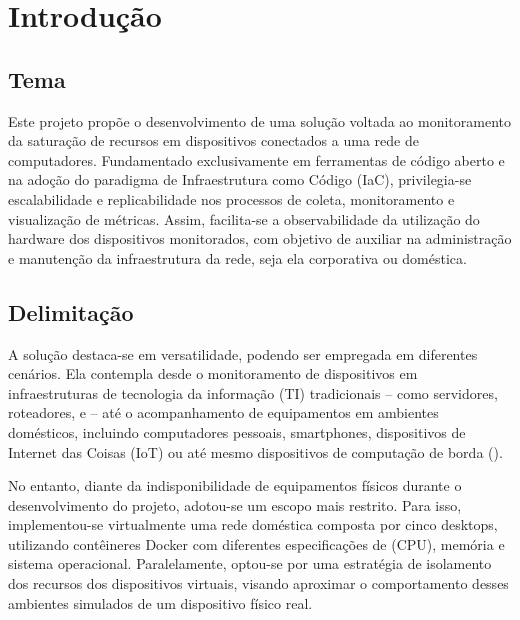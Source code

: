 \chapter{Introdução}
\label{chap1}

\section{Tema}

Este projeto propõe o desenvolvimento de uma solução voltada ao monitoramento da saturação de recursos em dispositivos conectados a uma rede de computadores. Fundamentado exclusivamente em ferramentas de código aberto e na adoção do paradigma de Infraestrutura como Código (IaC), privilegia-se escalabilidade e replicabilidade nos processos de coleta, monitoramento e visualização de métricas. Assim, facilita-se a observabilidade da utilização do hardware dos dispositivos monitorados, com objetivo de auxiliar na administração e manutenção da infraestrutura da rede, seja ela corporativa ou doméstica.

\section{Delimitação}
\label{section:Delimitação}

A solução destaca-se em versatilidade, podendo ser empregada em diferentes cenários. Ela contempla desde o monitoramento de dispositivos em infraestruturas de tecnologia da informação (TI) tradicionais -- como servidores, roteadores,  e  -- até o acompanhamento de equipamentos em ambientes domésticos, incluindo computadores pessoais, smartphones, dispositivos de Internet das Coisas (IoT) ou até mesmo dispositivos de computação de borda ().

No entanto, diante da indisponibilidade de equipamentos físicos durante o desenvolvimento do projeto, adotou-se um escopo mais restrito. Para isso, implementou-se virtualmente uma rede doméstica composta por cinco desktops, utilizando contêineres Docker com diferentes especificações de  (CPU), memória e sistema operacional. Paralelamente, optou-se por uma estratégia de isolamento dos recursos dos dispositivos virtuais, visando aproximar o comportamento desses ambientes simulados de um dispositivo físico real.

